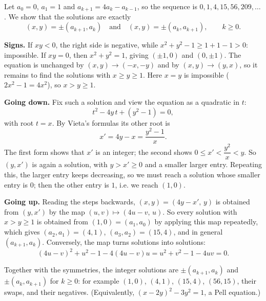Let $a_0=0$, $a_1=1$ and $a_{k+1}=4a_k-a_{k-1}$, so the sequence is $0,1,4,15,56,209,\ldots$. We show that the solutions are exactly
\[(x,y)=\pm(a_{k+1},a_k)\quad\text{and}\quad(x,y)=\pm(a_k,a_{k+1}),\qquad k\ge0 .\]

\textbf{Signs.} If $xy<0$, the right side is negative, while $x^2+y^2-1\ge1+1-1>0$: impossible. If $xy=0$, then $x^2+y^2=1$, giving $(\pm1,0)$ and $(0,\pm1)$. The equation is unchanged by $(x,y)\to(-x,-y)$ and by $(x,y)\to(y,x)$, so it remains to find the solutions with $x\ge y\ge1$. Here $x=y$ is impossible ($2x^2-1=4x^2$), so $x>y\ge1$.

\textbf{Going down.} Fix such a solution and view the equation as a quadratic in $t$:
\[t^2-4y\,t+(y^2-1)=0 ,\]
with root $t=x$. By Vieta's formulas its other root is
\[x'=4y-x=\dfrac{y^2-1}{x}.\]
The first form shows that $x'$ is an integer; the second shows $0\le x'<\dfrac{y^2}{x}<y$. So $(y,x')$ is again a solution, with $y>x'\ge0$ and a smaller larger entry. Repeating this, the larger entry keeps decreasing, so we must reach a solution whose smaller entry is $0$; then the other entry is $1$, i.e. we reach $(1,0)$.

\textbf{Going up.} Reading the steps backwards, $(x,y)=(4y-x',\,y)$ is obtained from $(y,x')$ by the map $(u,v)\mapsto(4u-v,\,u)$. So every solution with $x>y\ge1$ is obtained from $(1,0)=(a_1,a_0)$ by applying this map repeatedly, which gives $(a_2,a_1)=(4,1)$, $(a_3,a_2)=(15,4)$, and in general $(a_{k+1},a_k)$. Conversely, the map turns solutions into solutions:
\[(4u-v)^2+u^2-1-4(4u-v)u=u^2+v^2-1-4uv=0 .\]

Together with the symmetries, the integer solutions are $\pm(a_{k+1},a_k)$ and $\pm(a_k,a_{k+1})$ for $k\ge0$: for example $(1,0)$, $(4,1)$, $(15,4)$, $(56,15)$, their swaps, and their negatives. (Equivalently, $(x-2y)^2-3y^2=1$, a Pell equation.)
